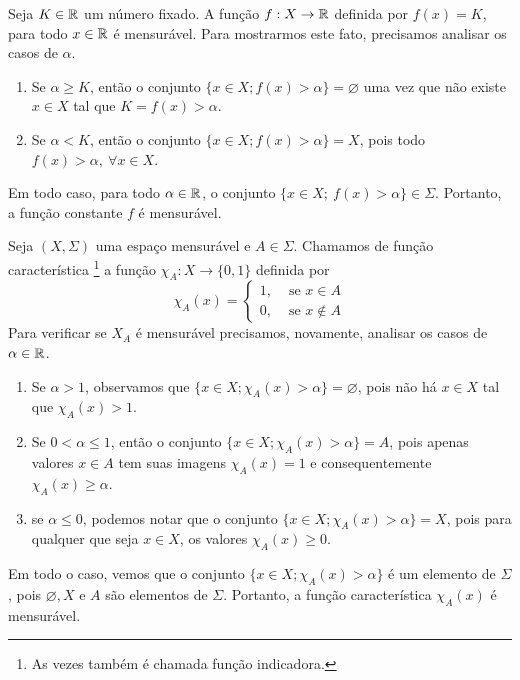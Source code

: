 \begin{example}
\label{ex:funcao-constante}
Seja $K \in \mathbb{R}$ um número fixado. 
A função $f: X \to \mathbb{R}$ definida por $f(x) = K$, para todo $x \in \mathbb{R}$  é mensurável.
Para mostrarmos este fato, precisamos analisar os casos de $\alpha$.
\begin{enumerate}[label*= (\Roman*)]
\item Se $\alpha \geq K$, então o conjunto $\{x \in X; f(x) > \alpha\} = \varnothing$ uma vez que não existe $x \in X$ tal que $K = f(x) > \alpha$.
\item Se $\alpha < K$, então  o conjunto $\{x \in X; f(x) > \alpha\} = X$, pois todo $f(x) > \alpha,\ \forall x \in X$.
\end{enumerate}
Em todo caso, para todo $\alpha \in \mathbb{R}$, o conjunto  $\{x \in X;\ f(x) > \alpha\} \in \Sigma$.
Portanto, a função constante $f$ é mensurável.

\end{example}

\begin{example}
    Seja $(X, \Sigma)$ uma espaço mensurável e $A \in \Sigma$.
    Chamamos de função característica \footnote{As vezes também é chamada  função indicadora.}
    a função $\chi_A: X \to \{0,1\}$ definida por 
    $$\chi_A(x) =\left\{\begin{array}{cc}
         1, & \textrm{\ se \ } x \in A \\
         0, & \textrm{\ se \ } x \notin A
    \end{array}\right.
    $$
Para verificar se $X_A$ é mensurável precisamos, novamente, analisar os casos de $\alpha \in \mathbb{R}$.
\begin{enumerate}[label*= (\Roman*)]
\item Se $\alpha > 1$, observamos que $\{x \in X; \chi_A(x)>  \alpha\} = \varnothing$, pois não há $x \in X$ tal que $\chi_A(x) > 1$.  
\item Se $ 0 <\alpha \leq 1$, então o conjunto $\{x \in X; \chi_A(x)>  \alpha\} = A$, pois apenas valores $x \in A$ tem suas imagens $\chi_A(x) = 1$ e consequentemente $\chi_A(x) \geq \alpha$.
\item  se $\alpha \leq 0$, podemos notar que o conjunto $\{x \in X; \chi_A(x)>  \alpha\} = X$, pois para qualquer que seja $x \in X$, os valores $\chi_A(x) \geq 0$.

\end{enumerate}
Em todo o caso, vemos que o conjunto $\{x \in X; \chi_A(x)>  \alpha\}$ é um elemento de $\Sigma$, pois $\varnothing, X$ e $A$ são elementos de $\Sigma$. Portanto, a função característica $\chi_A(x)$ é mensurável.

\end{example}

